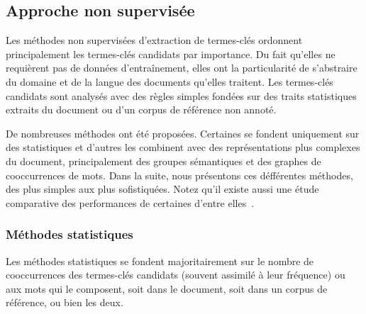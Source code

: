     \subsection{Approche non supervisée}
    \label{subsec:main-state_of_the_art-automatic_keyphrase_extraction-unsupervised_keyphrase_extraction}
      Les méthodes non supervisées d'extraction de termes-clés ordonnent
      principalement les termes-clés candidats par importance. Du fait qu'elles
      ne requièrent pas de données d'entraînement, elles ont la particularité de
      s'abstraire du domaine et de la langue des documents qu'elles traitent.
      Les termes-clés candidats sont analysés avec des règles simples fondées
      sur des traits statistiques extraits du document ou d'un corpus de
      référence non annoté.

      De nombreuses méthodes ont été proposées. Certaines se fondent uniquement
      sur des statistiques et d'autres les combinent avec des représentations
      plus complexes du document, principalement des groupes sémantiques et des
      graphes de cooccurrences de mots. Dans la suite, nous présentons ces
      défférentes méthodes, des plus simples aux plus sofistiquées. Notez qu'il
      existe aussi une étude comparative des performances de certaines d'entre
      elles~\cite{hassan2010conundrums}.

      \subsubsection{Méthodes statistiques}
      \label{subsubsec:main-state_of_the_art-automatic_keyphrase_extraction-unsupervised_keyphrase_extraction-statistical_approaches}
        Les méthodes statistiques se fondent majoritairement sur le nombre de
        cooccurrences des termes-clés candidats (souvent assimilé à leur
        fréquence) ou aux mots qui le composent, soit dans le document, soit
        dans un corpus de référence, ou bien les deux.


